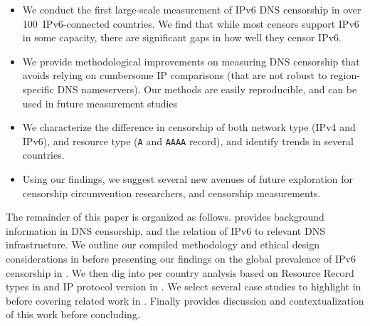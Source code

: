 \begin{itemize}
    \item
    We conduct the first large-scale measurement of IPv6 DNS censorship in
    over 100~IPv6-connected countries. %
    We find that while most censors support IPv6 in some capacity, there are
    significant gaps in how well they censor IPv6.


    \item We provide methodological improvements on measuring DNS censorship
    that avoids relying on cumbersome IP comparisons (that are not
    robust to region-specific DNS nameservers). Our methods are easily
    reproducible, and can be used in future measurement studies

    \item We characterize the difference in censorship of both network type
    (IPv4 and IPv6), and resource type ({\tt A} and {\tt AAAA} record), and
    identify trends in several countries.

    \item Using our findings, we suggest several new avenues of future
    exploration for censorship circumvention researchers, and censorship
    measurements.

\end{itemize}


The remainder of this paper is organized as follows.  provides
background information in DNS censorship, and the relation of IPv6 to relevant DNS
infrastructure. We outline our compiled methodology and ethical design
considerations in  before presenting our findings on the
global prevalence of IPv6 censorship in . We then dig into
per country analysis based on Resource Record types in  and
IP protocol version in . We select several case studies
to highlight in  before covering related work in
. Finally  provides discussion and
contextualization of this work before concluding.


